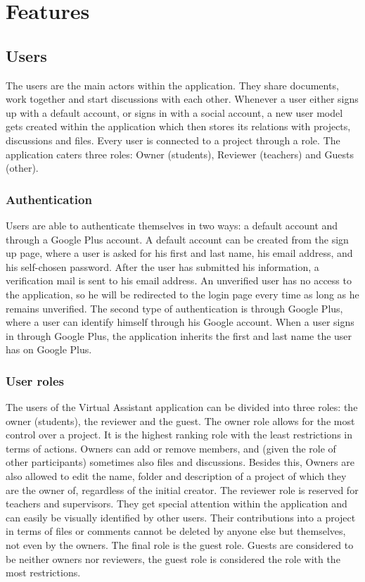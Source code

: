 \chapter{Features}
\section{Users}

The users are the main actors within the application. They share documents, work together and start discussions with each other. Whenever
a user either signs up with a default account, or signs in with a social account, a new user model gets created within the application which then
stores its relations with projects, discussions and files. Every user is connected to a project through a role. The application caters three roles: 
Owner (students), Reviewer (teachers) and Guests (other).

\subsection{Authentication}

Users are able to authenticate themselves in two ways: a default account and through a Google Plus account. A default account can be created from the 
sign up page, where a user is asked for his first and last name, his email address, and his self-chosen password. After the user has submitted his 
information, a verification mail is sent to his email address. An unverified user has no access to the application, so he will be redirected to the 
login page every time as long as he remains unverified. The second type of authentication is through
Google Plus, where a user can identify himself through his Google account. When a user signs in through Google Plus, the application inherits
the first and last name the user has on Google Plus.

\subsection{User roles}

The users of the Virtual Assistant application can be divided into three roles: the owner (students), the reviewer and the guest. The owner role allows for the 
most control over a project. It is the highest ranking role with the least restrictions in terms of actions.
Owners can add or remove members, and (given the role of other participants) sometimes also files and discussions. Besides this, Owners are also 
allowed to edit the name, folder and description of a project of which they are the owner of, regardless of the initial creator. 
The reviewer role is reserved for teachers and supervisors. They get special attention within the application and can easily be visually identified by 
other users. Their contributions into a project in terms of files or comments cannot be deleted by anyone else but themselves, not even by the owners. 
The final role is the guest role. Guests are considered to be neither owners nor reviewers, the guest role is considered the role with the most 
restrictions.

